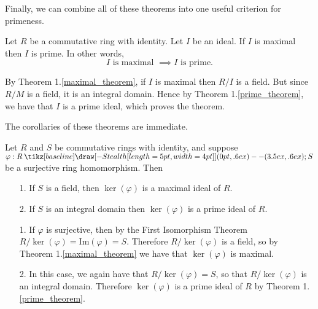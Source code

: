 \documentclass[12pt,letterpaper]{algebra_book}
\renewcommand{\to}{\mathbin{\tikz[baseline] \draw[-{Stealth[length=5pt,width=4pt]}] (0pt,.6ex) -- (3.5ex,.6ex);}}
\newcommand{\im}{\mbox{Im}}
\renewcommand{\phi}{\varphi}
\theoremstyle{definition}
\begin{document}
    Finally, we can combine all of these theorems into one useful
    criterion for primeness. 

    \begin{thm}
        Let $R$ be a commutative ring with identity. Let $I$ be an
        ideal. If $I$ is maximal then $I$ is prime. In other
        words, 
        \[
            I \text{ is maximal } \implies I \text{ is prime.}
        \]
        \vspace{-0.8cm}
    \end{thm}

    \begin{prf}
        By Theorem 1.\ref{maximal_theorem}, if $I$ is maximal then
        $R/I$ is a field. But since $R/M$ is a field, it is an
        integral domain. Hence by Theorem 1.\ref{prime_theorem},
        we have that $I$ is a prime ideal, which proves the theorem.
    \end{prf}

    The corollaries of these theorems are immediate. 

    \begin{corollary}
        Let $R$ and $S$ be commutative rings with identity, and suppose 
        $\phi: R \to S$ be a surjective ring homomorphism. Then 
        \begin{itemize}
            \item[1.] If $S$ is a field, then $\ker(\phi)$ is a
            maximal ideal of $R$. 
            \item[2.] If $S$ is an integral domain then
            $\ker(\phi)$ is a prime ideal of $R$. 
        \end{itemize}
    \end{corollary}

    \begin{prf}
        \begin{itemize}
            \item[1.] If $\phi$ is surjective, then by the First
            Isomorphism Theorem $R/\ker(\phi) = \im(\phi) = S$.
            Therefore $R/\ker(\phi)$ is a field, so by Theorem
            1.\ref{maximal_theorem} we have that $\ker(\phi)$ is
            maximal. 

            \item[2.] In this case, we again have that
            $R/\ker(\phi) = S$, so that $R/\ker(\phi)$ is an
            integral domain. Therefore $\ker(\phi)$ is a prime
            ideal of $R$ by Theorem 1.\ref{prime_theorem}.
        \end{itemize}
    \end{prf}
    
\end{document}
